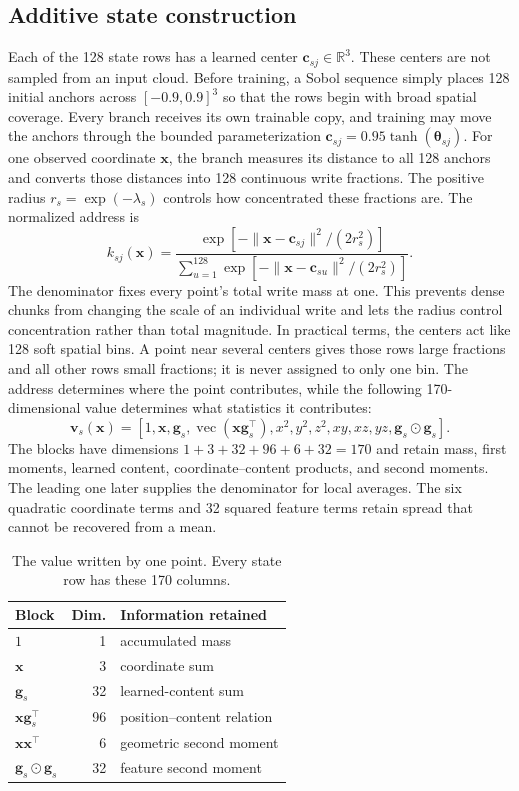 \documentclass[times,twocolumn,final,authoryear]{elsarticle}
\newcommand{\R}{\mathbb{R}}
\newcommand{\vect}{\operatorname{vec}}
\begin{document}
\subsection{Additive state construction}
Each of the 128 state rows has a learned center $\bm c_{sj}\in\R^3$. These centers are not sampled from an input cloud. Before training, a Sobol sequence simply places 128 initial anchors across $[-0.9,0.9]^3$ so that the rows begin with broad spatial coverage. Every branch receives its own trainable copy, and training may move the anchors through the bounded parameterization $\bm c_{sj}=0.95\tanh(\bm\theta_{sj})$. For one observed coordinate $\bm x$, the branch measures its distance to all 128 anchors and converts those distances into 128 continuous write fractions. The positive radius $r_s=\exp(-\lambda_s)$ controls how concentrated these fractions are. The normalized address is
\begin{equation}
k_{sj}(\bm x)=\frac{\exp[-\|\bm x-\bm c_{sj}\|^2/(2r_s^2)]}
{\sum_{u=1}^{128}\exp[-\|\bm x-\bm c_{su}\|^2/(2r_s^2)]}.
\label{eq:key-main}
\end{equation}
The denominator fixes every point's total write mass at one. This prevents dense chunks from changing the scale of an individual write and lets the radius control concentration rather than total magnitude. In practical terms, the centers act like 128 soft spatial bins. A point near several centers gives those rows large fractions and all other rows small fractions; it is never assigned to only one bin. The address determines where the point contributes, while the following 170-dimensional value determines what statistics it contributes:
\begin{equation}
\bm v_s(\bm x)=[1,\bm x,\bm g_s,\vect(\bm x\bm g_s^\top),
 x^2,y^2,z^2,xy,xz,yz,\bm g_s\odot\bm g_s].
\label{eq:value-main}
\end{equation}
The blocks have dimensions $1+3+32+96+6+32=170$ and retain mass, first moments, learned content, coordinate--content products, and second moments. The leading one later supplies the denominator for local averages. The six quadratic coordinate terms and 32 squared feature terms retain spread that cannot be recovered from a mean.
\begin{table}[t]
\centering
\caption{The value written by one point. Every state row has these 170 columns.}
\label{tab:value-layout-main}
\begin{tabular}{lrl}
\toprule
Block & Dim. & Information retained \\
\midrule
$1$ & 1 & accumulated mass \\
$\bm x$ & 3 & coordinate sum \\
$\bm g_s$ & 32 & learned-content sum \\
$\bm x\bm g_s^\top$ & 96 & position--content relation \\
$\bm x\bm x^\top$ & 6 & geometric second moment \\
$\bm g_s\odot\bm g_s$ & 32 & feature second moment \\
\bottomrule
\end{tabular}
\end{table}
\end{document}
